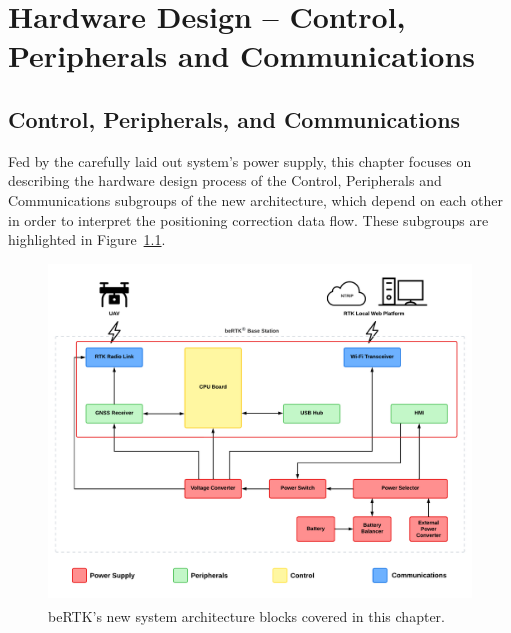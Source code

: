

\chapter{Hardware Design -- Control, Peripherals and Communications}\label{cha:chapter4_C_PC}


\section{Control, Peripherals, and Communications}\label{sec:41_C_PC}

Fed by the carefully laid out system's power supply, this chapter focuses on describing the hardware design process of the Control, Peripherals and Communications subgroups of the new architecture, which depend on each other in order to interpret the positioning correction data flow. These subgroups are highlighted in Figure~\ref{fig:architecture_new_C_PC}.

\begin{figure}[h]
	\centering
	\includegraphics[width=1.0\textwidth]{Chapters/Figures/chapter3/Chapter4_bloackDiagram.pdf}
	\caption{beRTK\textsuperscript{\textregistered}'s new system architecture blocks covered in this chapter.}
	\label{fig:architecture_new_C_PC}
\end{figure}

